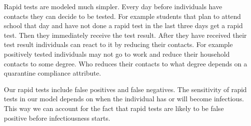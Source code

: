 Rapid tests are modeled much simpler. Every day before individuals have contacts they can
decide to be tested. For example students that plan to
attend school that day and have not done a rapid test in the last three days get a rapid
test. Then they immediately receive the test result. After they have received their test
result individuals can react to it by reducing their contacts. For example positively
tested individuals may not go to work and reduce their household contacts to some degree.
Who reduces their contacts to what degree depends on a quarantine compliance attribute.

Our rapid tests include false positives and false negatives. The sensitivity of rapid
tests in our model depends on when the individual has or will become infectious. This way
we can account for the fact that rapid tests are likely to be false positive before
infectiousness starts.


